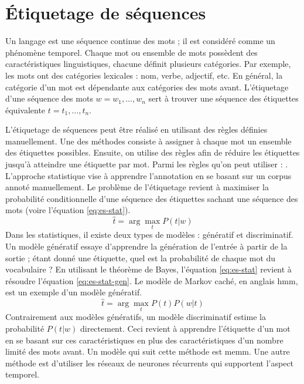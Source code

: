 \documentclass{KodeBook}
\begin{document}
\section{Étiquetage de séquences}

Un langage est une séquence continue des mots ; il est considéré comme un phénomène temporel.
Chaque mot ou ensemble de mots possèdent des caractéristiques linguistiques, chacune définit plusieurs catégories. 
Par exemple, les mots ont des catégories lexicales : nom, verbe, adjectif, etc.
En général, la catégorie d'un mot est dépendante aux catégories des mots avant.
L'étiquetage d'une séquence des mots $w = w_1, \ldots, w_n$ sert à trouver une séquence des étiquettes équivalente $t = t_1, \ldots, t_n$. 

L'étiquetage de séquences peut être réalisé en utilisant des règles définies manuellement. 
Une des méthodes consiste à assigner à chaque mot un ensemble des étiquettes possibles. 
Ensuite, on utilise des règles afin de réduire les étiquettes jusqu'à atteindre une étiquette par mot.
Parmi les règles qu'on peut utiliser : . 
L'approche statistique vise à apprendre l'annotation en se basant sur un corpus annoté manuellement. 
Le problème de l'étiquetage revient à maximiser la probabilité conditionnelle d'une séquence des étiquettes sachant une séquence des mots (voire l'équation \ref{eq:es-stat}).
\begin{equation}\label{eq:es-stat}
	\hat{t} = \arg\max\limits_t P(t | w)
\end{equation}
Dans les statistiques, il existe deux types de modèles : génératif et discriminatif. 
Un modèle génératif essaye d'apprendre la génération de l'entrée à partir de la sortie ; étant donné une étiquette, quel est la probabilité de chaque mot du vocabulaire ?
En utilisant le théorème de Bayes, l'équation \ref{eq:es-stat} revient à résoudre l'équation \ref{eq:es-stat-gen}.
Le modèle de Markov caché, en anglais \ac{hmm}, est un exemple d'un modèle génératif.
\begin{equation}\label{eq:es-stat-gen}
	\hat{t} = \arg\max\limits_t P(t) P(w | t) 
\end{equation}
Contrairement aux modèles génératifs, un modèle discriminatif estime la probabilité $P(t | w)$ directement. 
Ceci revient à apprendre l'étiquette d'un mot en se basant sur ces caractéristiques en plus des caractéristiques d'un nombre limité des mots avant.
Un modèle qui suit cette méthode est \ac{memm}.
Une autre méthode est d'utiliser les réseaux de neurones récurrents qui supportent l'aspect temporel. 
\end{document}
